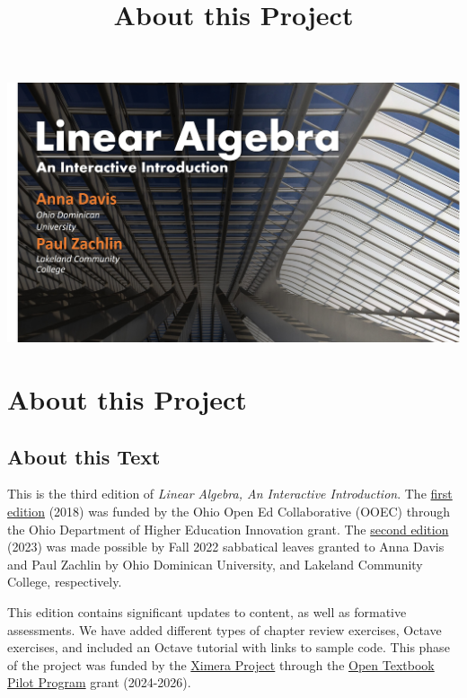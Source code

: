 \documentclass{ximera}
\title{About this Project} \license{CC BY-NC-SA 4.0}
\begin{document}
\begin{abstract}
\end{abstract}
\maketitle

\begin{image}
\includegraphics{BookCover1.jpg}
\end{image}

\section*{About this Project}

\subsection*{About this Text}
This is the third edition of \emph{Linear Algebra, An Interactive Introduction}.  The \href{https://ximera.osu.edu/la/LinearAlgebra}{first edition} (2018) was funded by the Ohio Open Ed Collaborative (OOEC) through the Ohio Department of Higher Education Innovation grant. The \href{https://ximera.osu.edu/oerlinalg}{second edition} (2023) was made possible by Fall 2022 sabbatical leaves granted to Anna Davis and Paul Zachlin by Ohio Dominican University, and Lakeland Community College, respectively.

This edition contains significant updates to content, as well as formative assessments.  We have added different types of chapter review exercises, Octave exercises, and included an Octave tutorial with links to sample code.  This phase of the project was funded by the \href{https://github.com/XimeraProject}{Ximera Project} through the \href{https://www2.ed.gov/programs/otp/index.html}{Open Textbook Pilot Program} grant (2024-2026).
\end{document}
